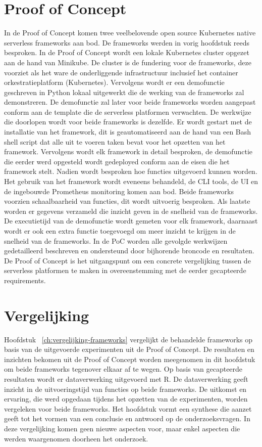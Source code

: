 \section{Proof of Concept}
In de Proof of Concept komen twee veelbelovende open source Kubernetes native serverless frameworks aan bod. De frameworks werden in vorig hoofdstuk reeds besproken. In de Proof of Concept wordt een lokale Kubernetes cluster opgezet aan de hand van Minikube. De cluster is de fundering voor de frameworks, deze voorziet als het ware de onderliggende infrastructuur inclusief het container orkestratieplatform (Kubernetes). Vervolgens wordt er een demofunctie geschreven in Python lokaal uitgewerkt die de werking van de frameworks zal demonstreren. De demofunctie zal later voor beide frameworks worden aangepast conform aan de template die de serverless platformen verwachten. De werkwijze die doorlopen wordt voor beide frameworks is dezelfde. Er wordt gestart met de installatie van het framework, dit is geautomatiseerd aan de hand van een Bash shell script dat alle uit te voeren taken bevat voor het opzetten van het framework. Vervolgens wordt elk framework in detail besproken, de demofunctie die eerder werd opgesteld wordt gedeployed conform aan de eisen die het framework stelt. Nadien wordt besproken hoe functies uitgevoerd kunnen worden. Het gebruik van het framework wordt eveneens behandeld, de CLI tools, de UI en de ingebouwde Prometheus monitoring komen aan bod. Beide frameworks voorzien schaalbaarheid van functies, dit wordt uitvoerig besproken. Als laatste worden er gegevens verzameld die inzicht geven in de snelheid van de frameworks. De executietijd van de demofunctie wordt gemeten voor elk framework, daarnaast wordt er ook een extra functie toegevoegd om meer inzicht te krijgen in de snelheid van de frameworks. In de PoC worden alle gevolgde werkwijzen gedetailleerd beschreven en ondersteund door bijhorende broncode en resultaten. De Proof of Concept is het uitgangspunt om een concrete vergelijking tussen de serverless platformen te maken in overeenstemming met de eerder gecapteerde requirements.

\section{Vergelijking}
Hoofdstuk ~\ref{ch:vergelijking-frameworks} vergelijkt de behandelde frameworks op basis van de uitgevoerde experimenten uit de Proof of Concept. De resultaten en inzichten bekomen uit de Proof of Concept worden meegenomen in dit hoofdstuk om beide frameworks tegenover elkaar af te wegen. Op basis van gecapteerde resultaten wordt er dataverwerking uitgevoerd met R. De dataverwerking geeft inzicht in de uitvoeringstijd van functies op beide frameworks. De uitkomst en ervaring, die werd opgedaan tijdens het opzetten van de experimenten, worden vergeleken voor beide frameworks. Het hoofdstuk vormt een synthese die aanzet geeft tot het vormen van een conclusie en antwoord op de onderzoeksvragen. In deze vergelijking komen geen nieuwe aspecten voor, maar enkel aspecten die werden waargenomen doorheen het onderzoek.

